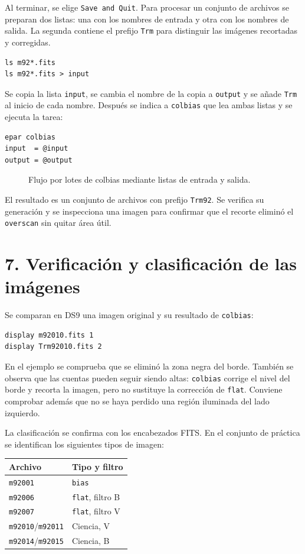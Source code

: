 \documentclass[11pt,twocolumn]{article}
\newcommand{\widefigure}[2]{\begin{figure}[!t]\centering\caption{#2}\end{figure}}
\begin{document}
Al terminar, se elige \texttt{Save and Quit}. Para procesar un conjunto de
archivos se preparan dos listas: una con los nombres de entrada y otra con los
nombres de salida. La segunda contiene el prefijo \texttt{Trm} para distinguir
las imágenes recortadas y corregidas.

\begin{verbatim}
ls m92*.fits
ls m92*.fits > input
\end{verbatim}

Se copia la lista \texttt{input}, se cambia el nombre de la copia a
\texttt{output} y se añade \texttt{Trm} al inicio de cada nombre. Después se
indica a \texttt{colbias} que lea ambas listas y se ejecuta la tarea:

\begin{verbatim}
epar colbias
input  = @input
output = @output
\end{verbatim}

\widefigure{figuras/listas_colbias.tex}{Flujo por lotes de colbias mediante listas de entrada y salida.}

El resultado es un conjunto de archivos con prefijo \texttt{Trm92}. Se verifica su generación y se inspecciona una imagen para confirmar que el recorte eliminó el \texttt{overscan} sin quitar área útil.

\section*{7. Verificación y clasificación de las imágenes}

Se comparan en DS9 una imagen original y su resultado de \texttt{colbias}:

\begin{verbatim}
display m92010.fits 1
display Trm92010.fits 2
\end{verbatim}

En el ejemplo se comprueba que se eliminó la zona negra del borde. También se
observa que las cuentas pueden seguir siendo altas: \texttt{colbias} corrige
el nivel del borde y recorta la imagen, pero no sustituye la corrección de
\texttt{flat}. Conviene comprobar además que no se haya perdido una región
iluminada del lado izquierdo.

La clasificación se confirma con los encabezados FITS. En el conjunto de
práctica se identifican los siguientes tipos de imagen:

\begin{center}
\small
\begin{tabular}{ll}
\hline
Archivo & Tipo y filtro\\
\hline
\texttt{m92001} & \texttt{bias}\\
\texttt{m92006} & \texttt{flat}, filtro B\\
\texttt{m92007} & \texttt{flat}, filtro V\\
\texttt{m92010}/\texttt{m92011} & Ciencia, V\\
\texttt{m92014}/\texttt{m92015} & Ciencia, B\\
\hline
\end{tabular}
\end{center}
\end{document}
